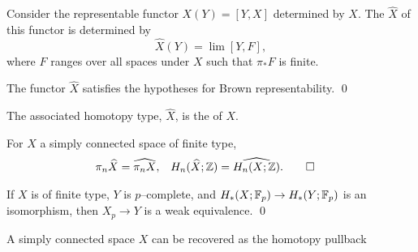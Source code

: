 \begin{definition}
Consider the representable functor $X(Y) = [Y, X]$ determined by $X$.
The  $\widehat X$ of this functor is determined by \[\widehat X(Y) = \lim [Y, F],\] where $F$ ranges over all spaces under $X$ such that $\pi_* F$ is finite.
\end{definition}

\begin{lemma}
The functor $\widehat X$ satisfies the hypotheses for Brown representability. \qed
\end{lemma}

\begin{definition}
The associated homotopy type, $\widehat X$, is the  of $X$.
\end{definition}

\begin{lemma}
For $X$ a simply connected space of finite type,
\begin{align*}
\pi_n \widehat X & = \widehat{\pi_n X}, &
H_n(\widehat X; \mathbb Z) & = \widehat{H_n(X; \mathbb Z)}.
\qed
\end{align*}
\end{lemma}

\begin{lemma}\label{WhatIsModPGoodFor}
If $X$ is of finite type, $Y$ is $p$--complete, and $H_*(X; \mathbb F_p) \to H_*(Y; \mathbb F_p)$ is an isomorphism, then $X_p \to Y$ is a weak equivalence. \qed
\end{lemma}

\begin{theorem}
A simply connected space $X$ can be recovered as the homotopy pullback
\begin{center}
\end{center}
\end{theorem}







